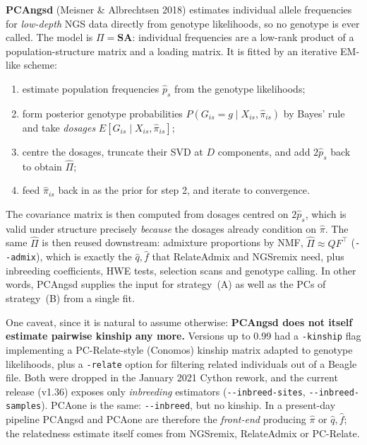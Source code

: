 \documentclass[10pt,a4paper]{article}
\begin{document}
\textbf{PCAngsd} (Meisner \& Albrechtsen 2018) estimates individual allele frequencies for \emph{low-depth}
NGS data directly from genotype likelihoods, so no genotype is ever called. The model is
$\Pi = \mathbf{S}\mathbf{A}$: individual frequencies are a low-rank product of a population-structure
matrix and a loading matrix. It is fitted by an iterative EM-like scheme:
\begin{enumerate}
  \item estimate population frequencies $\hat p_s$ from the genotype likelihoods;
  \item form posterior genotype probabilities $P(G_{is}=g\mid X_{is},\hat\pi_{is})$ by Bayes' rule and take
  \emph{dosages} $E[G_{is}\mid X_{is},\hat\pi_{is}]$;
  \item centre the dosages, truncate their SVD at $D$ components, and add $2\hat p_s$ back to obtain
  $\hat\Pi$;
  \item feed $\hat\pi_{is}$ back in as the prior for step 2, and iterate to convergence.
\end{enumerate}
The covariance matrix is then computed from dosages centred on $2\hat p_s$, which is valid under structure
precisely \emph{because} the dosages already condition on $\hat\pi$. The same $\hat\Pi$ is then reused
downstream: admixture proportions by NMF, $\hat\Pi \approx QF^{\!\top}$ (\texttt{-{}-admix}), which is exactly
the $\hat q,\hat f$ that RelateAdmix and NGSremix need, plus inbreeding coefficients, HWE tests, selection
scans and genotype calling. In other words, PCAngsd supplies the input for strategy~(A) as well as the PCs of
strategy~(B) from a single fit.

One caveat, since it is natural to assume otherwise: \textbf{PCAngsd does not itself estimate pairwise
kinship any more.} Versions up to 0.99 had a \texttt{-kinship} flag implementing a PC-Relate-style (Conomos)
kinship matrix adapted to genotype likelihoods, plus a \texttt{-relate} option for filtering related
individuals out of a Beagle file. Both were dropped in the January 2021 Cython rework, and the current
release (v1.36) exposes only \emph{inbreeding} estimators (\texttt{-{}-inbreed-sites},
\texttt{-{}-inbreed-samples}). PCAone is the same: \texttt{-{}-inbreed}, but no kinship. In a present-day
pipeline PCAngsd and PCAone are therefore the \emph{front-end} producing $\hat\pi$ or $\hat q,\hat f$; the
relatedness estimate itself comes from NGSremix, RelateAdmix or PC-Relate.
\end{document}
